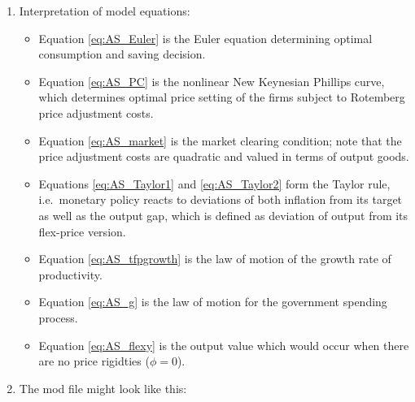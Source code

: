 \begin{enumerate}

\item Interpretation of model equations:
\begin{itemize}
    \item Equation \eqref{eq:AS_Euler} is the Euler equation determining optimal consumption and saving decision.
    \item Equation \eqref{eq:AS_PC} is the nonlinear New Keynesian Phillips curve,
      which determines optimal price setting of the firms subject to Rotemberg price adjustment costs.
    \item Equation \eqref{eq:AS_market} is the market clearing condition;
      note that the price adjustment costs are quadratic and valued in terms of output goods.
    \item Equations \eqref{eq:AS_Taylor1} and \eqref{eq:AS_Taylor2} form the Taylor rule,
      i.e.\ monetary policy reacts to deviations of both inflation from its target
      as well as the output gap, which is defined as deviation of output from its flex-price version.
    \item Equation \eqref{eq:AS_tfpgrowth} is the law of motion of the growth rate of productivity.
    \item Equation \eqref{eq:AS_g} is the law of motion for the government spending process.
    \item Equation \eqref{eq:AS_flexy} is the output value which would occur when there are no price rigidties ($\phi=0$).
\end{itemize}

\item The mod file might look like this:



\end{enumerate}
